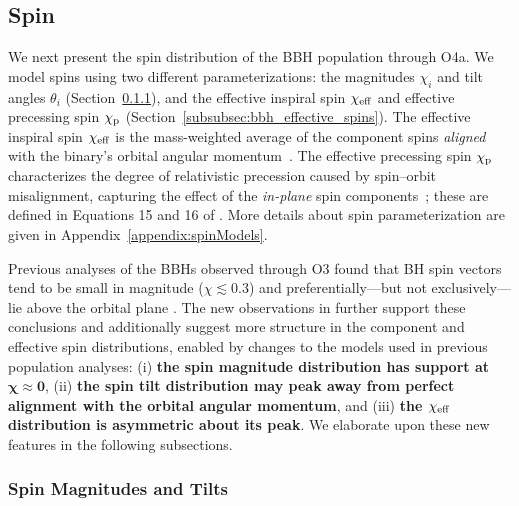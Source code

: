\subsection{Spin}
\label{subsec:bbh_spins}

We next present the spin distribution of the \ac{BBH} population through O4a.
We model spins using two different parameterizations: the magnitudes $\chi_i$ and tilt angles $\theta_i$ (Section~\ref{subsubsec:bbh_spin_mag_and_tilts}), and the effective inspiral spin $\chi_{\rm eff}$ and effective precessing spin $\chi_\mathrm{p}$ (Section~\ref{subsubsec:bbh_effective_spins}).
The effective inspiral spin $\chi_{\rm eff}$ is the mass-weighted average of the component spins \textit{aligned} with the binary's orbital angular momentum~\citep{Racine:2008qv,Ajith:2009bn}.
The effective precessing spin $\chi_\mathrm{p}$ characterizes the degree of relativistic precession caused by spin--orbit misalignment, capturing the effect of the \textit{in-plane} spin components~\citep{Schmidt:2010it,Schmidt:2012rh,Schmidt:2014iyl,Gerosa:2020aiw}; these are defined in Equations 15 and 16 of \cite{GWTC:Introduction}.
More details about spin parameterization are given in Appendix~\ref{appendix:spinModels}.

Previous analyses of the \acp{BBH} observed through O3 found that \ac{BH} spin vectors tend to be small in magnitude ($\chi\lesssim 0.3$) and preferentially---but not exclusively---lie above the orbital plane \citep[$\cos\theta>0$;][]{LIGOScientific:2018jsj,LIGOScientific:2020kqk,KAGRA:2021duu}. 
The new observations in \gwtcfour further support these conclusions and additionally suggest more structure in the component and effective spin distributions, enabled by changes to the models used in previous population analyses:
(i) \textbf{the spin magnitude distribution has support at $\bm{\chi\approx 0}$}, (ii) \textbf{the spin tilt distribution may peak away from perfect alignment with the orbital angular momentum}, and (iii) \textbf{the $\bm{\chieff}$ distribution is asymmetric about its peak}.
We elaborate upon these new features in the following subsections.


\subsubsection{Spin Magnitudes and Tilts}
\label{subsubsec:bbh_spin_mag_and_tilts}


